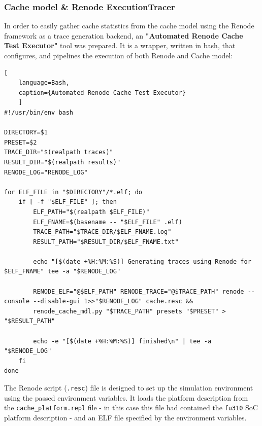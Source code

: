 \subsubsection{Cache model \& Renode ExecutionTracer}
In order to easily gather cache statistics from the cache model using the Renode framework as a trace generation backend, an \textbf{"Automated Renode Cache Test Executor"}
tool was prepared. It is a wrapper, written in bash, that configures, and pipelines the execution of both Renode and Cache model:


\begin{center}
\centering
\begin{minipage}{\linewidth}
\begin{lstlisting}[
    language=Bash,
    caption={Automated Renode Cache Test Executor}
    ]
#!/usr/bin/env bash

DIRECTORY=$1
PRESET=$2
TRACE_DIR="$(realpath traces)"
RESULT_DIR="$(realpath results)"
RENODE_LOG="RENODE_LOG"

for ELF_FILE in "$DIRECTORY"/*.elf; do
	if [ -f "$ELF_FILE" ]; then
		ELF_PATH="$(realpath $ELF_FILE)"
		ELF_FNAME=$(basename -- "$ELF_FILE" .elf)
		TRACE_PATH="$TRACE_DIR/$ELF_FNAME.log"
		RESULT_PATH="$RESULT_DIR/$ELF_FNAME.txt"

		echo "[$(date +%H:%M:%S)] Generating traces using Renode for $ELF_FNAME" tee -a "$RENODE_LOG"

		RENODE_ELF="@$ELF_PATH" RENODE_TRACE="@$TRACE_PATH" renode --console --disable-gui 1>>"$RENODE_LOG" cache.resc &&
		renode_cache_mdl.py "$TRACE_PATH" presets "$PRESET" > "$RESULT_PATH"

		echo -e "[$(date +%H:%M:%S)] finished\n" | tee -a "$RENODE_LOG"
	fi
done
\end{lstlisting}
\end{minipage}
\end{center}

\noindent The Renode script (\texttt{.resc}) file is designed to set up the simulation environment using the passed environment variables. It loads the platform description from
the \texttt{cache\_platform.repl} file - in this case this file had contained the \texttt{fu310} SoC platform description - and an ELF file specified by the environment variables.


